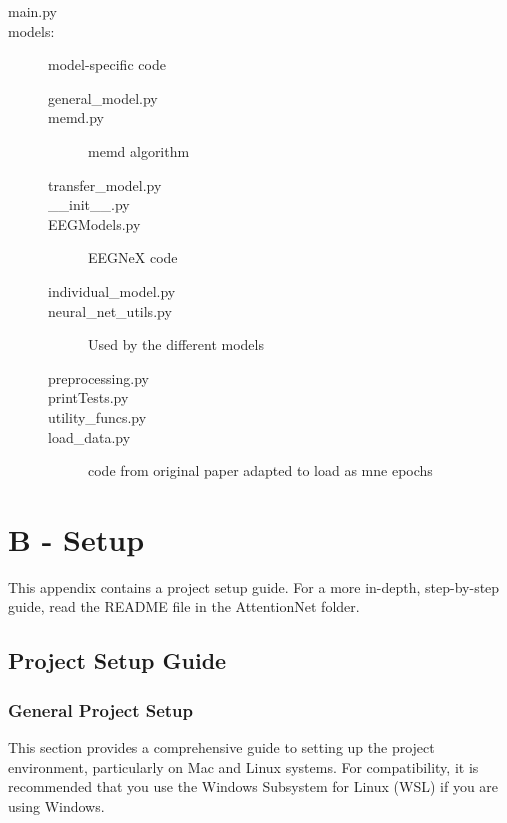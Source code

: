 \begin{footnotesize}
\begin{itemize}[label={}, leftmargin=*]
\begin{description}
\begin{description}
            \item [main.py]
            \item [models:] model-specific code
                \begin{description}
                \item [general\_model.py]
                \item [memd.py]    memd algorithm
                \item [transfer\_model.py]
                \item [\_\_init\_\_.py]
                \item [EEGModels.py]    EEGNeX code
                \item [individual\_model.py]
                \item [neural\_net\_utils.py]   Used by the different models
                \item [preprocessing.py]
                \item [printTests.py]
                \item [utility\_funcs.py]
                \item [load\_data.py]   code from original paper adapted to load as mne epochs
                \end{description}
            \end{description}
            \end{description}
\end{itemize}
\end{footnotesize}







\chapter{B - Setup}
\label{Appendix B}
This appendix contains a project setup guide. For a more in-depth, step-by-step guide, read the README file in the AttentionNet folder.

\section{Project Setup Guide}
\subsection{General Project Setup}

This section provides a comprehensive guide to setting up the project environment, particularly on Mac and Linux systems. For compatibility, it is recommended that you use the Windows Subsystem for Linux (WSL) if you are using Windows.

